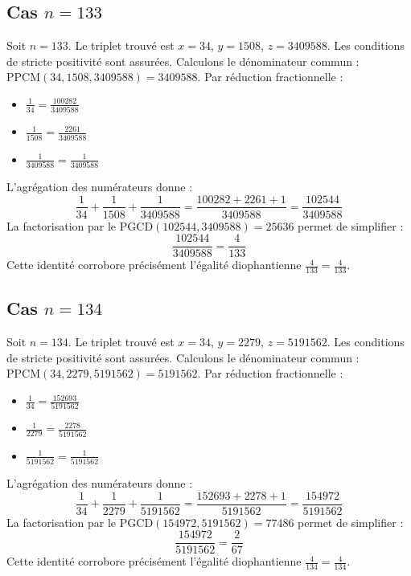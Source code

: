 \documentclass[11pt,a4paper]{article}
\begin{document}
\subsection{Cas $n = 133$}
Soit $n = 133$. Le triplet trouvé est $x = 34$, $y = 1508$, $z = 3409588$.
Les conditions de stricte positivité sont assurées.
Calculons le dénominateur commun : $\text{PPCM}(34, 1508, 3409588) = 3409588$.
Par réduction fractionnelle :
\begin{itemize}
    \item $\frac{1}{34} = \frac{100282}{3409588}$
    \item $\frac{1}{1508} = \frac{2261}{3409588}$
    \item $\frac{1}{3409588} = \frac{1}{3409588}$
\end{itemize}
L'agrégation des numérateurs donne :
$$ \frac{1}{34} + \frac{1}{1508} + \frac{1}{3409588} = \frac{100282 + 2261 + 1}{3409588} = \frac{102544}{3409588} $$
La factorisation par le $\text{PGCD}(102544, 3409588) = 25636$ permet de simplifier :
$$ \frac{102544}{3409588} = \frac{4}{133} $$
Cette identité corrobore précisément l'égalité diophantienne $\frac{4}{133} = \frac{4}{133}$.

\subsection{Cas $n = 134$}
Soit $n = 134$. Le triplet trouvé est $x = 34$, $y = 2279$, $z = 5191562$.
Les conditions de stricte positivité sont assurées.
Calculons le dénominateur commun : $\text{PPCM}(34, 2279, 5191562) = 5191562$.
Par réduction fractionnelle :
\begin{itemize}
    \item $\frac{1}{34} = \frac{152693}{5191562}$
    \item $\frac{1}{2279} = \frac{2278}{5191562}$
    \item $\frac{1}{5191562} = \frac{1}{5191562}$
\end{itemize}
L'agrégation des numérateurs donne :
$$ \frac{1}{34} + \frac{1}{2279} + \frac{1}{5191562} = \frac{152693 + 2278 + 1}{5191562} = \frac{154972}{5191562} $$
La factorisation par le $\text{PGCD}(154972, 5191562) = 77486$ permet de simplifier :
$$ \frac{154972}{5191562} = \frac{2}{67} $$
Cette identité corrobore précisément l'égalité diophantienne $\frac{4}{134} = \frac{4}{134}$.
\end{document}
